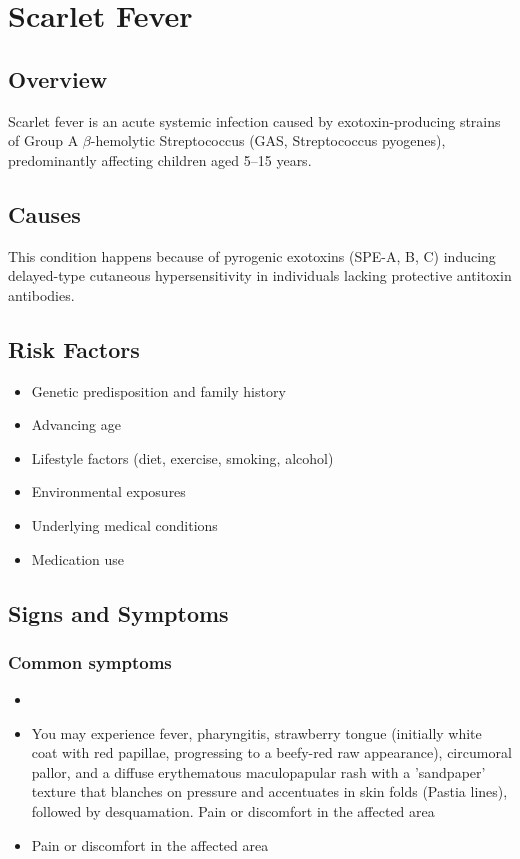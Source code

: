 \chapter{Scarlet Fever}
\label{sec:Scarlet Fever}

\section{Overview}
Scarlet fever is an acute systemic infection caused by exotoxin-producing strains of Group A $\beta$-hemolytic Streptococcus (GAS, Streptococcus pyogenes), predominantly affecting children aged 5--15 years.
\section{Causes}
This condition happens because of pyrogenic exotoxins (SPE-A, B, C) inducing delayed-type cutaneous hypersensitivity in individuals lacking protective antitoxin antibodies.     
\section{Risk Factors}

\begin{itemize}[noitemsep]
  \item Genetic predisposition and family history
  \item Advancing age
  \item Lifestyle factors (diet, exercise, smoking, alcohol)
  \item Environmental exposures
  \item Underlying medical conditions
  \item Medication use
\end{itemize}
\section{Signs and Symptoms}

\subsection{Common symptoms}
\begin{itemize}[noitemsep]
  \item \item You may experience fever, pharyngitis, strawberry tongue (initially white coat with red papillae, progressing to a beefy-red raw appearance), circumoral pallor, and a diffuse erythematous maculopapular rash with a 'sandpaper' texture that blanches on pressure and accentuates in skin folds (Pastia lines), followed by desquamation. Pain or discomfort in the affected area    \item Pain or discomfort in the affected area
  \end{itemize}


